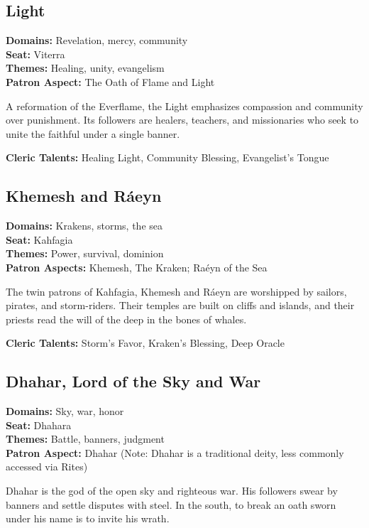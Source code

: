 \subsection*{Light}

\textbf{Domains:} Revelation, mercy, community \\
\textbf{Seat:} Viterra \\
\textbf{Themes:} Healing, unity, evangelism \\
\textbf{Patron Aspect:} The Oath of Flame and Light

A reformation of the Everflame, the Light emphasizes compassion and community over punishment. Its followers are healers, teachers, and missionaries who seek to unite the faithful under a single banner.

\textbf{Cleric Talents:} Healing Light, Community Blessing, Evangelist's Tongue

\subsection*{Khemesh and Ráeyn}

\textbf{Domains:} Krakens, storms, the sea \\
\textbf{Seat:} Kahfagia \\
\textbf{Themes:} Power, survival, dominion \\
\textbf{Patron Aspects:} Khemesh, The Kraken; Raéyn of the Sea

The twin patrons of Kahfagia, Khemesh and Ráeyn are worshipped by sailors, pirates, and storm-riders. Their temples are built on cliffs and islands, and their priests read the will of the deep in the bones of whales.

\textbf{Cleric Talents:} Storm's Favor, Kraken's Blessing, Deep Oracle

\subsection*{Dhahar, Lord of the Sky and War}

\textbf{Domains:} Sky, war, honor \\
\textbf{Seat:} Dhahara \\
\textbf{Themes:} Battle, banners, judgment \\
\textbf{Patron Aspect:} Dhahar (Note: Dhahar is a traditional deity, less commonly accessed via Rites)

Dhahar is the god of the open sky and righteous war. His followers swear by banners and settle disputes with steel. In the south, to break an oath sworn under his name is to invite his wrath.

